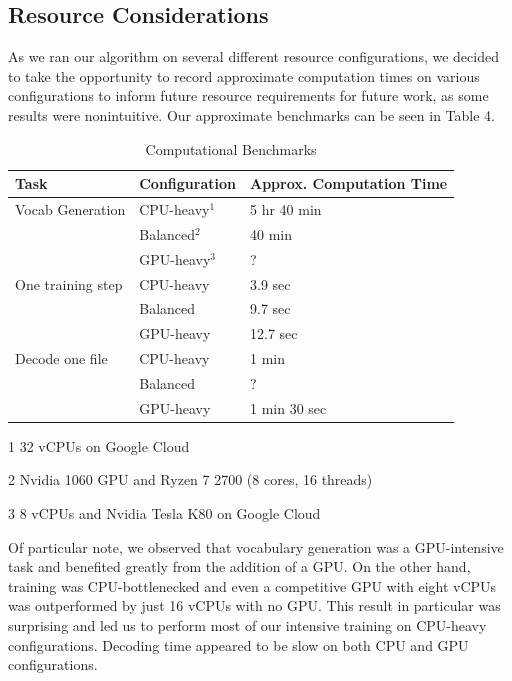 \documentclass[11pt]{article}
\begin{document}
\begin{appendices}

\section{Resource Considerations}

As we ran our algorithm on several different resource configurations, we decided to take the opportunity to record approximate computation times on various configurations to inform future resource requirements for future work, as some results were nonintuitive. Our approximate benchmarks can be seen in Table 4.

\begin{table}[h!]
\begin{threeparttable}
\centering
\begin{small}
\begin{tabular}{|p{2.6cm}|p{2.2cm}|p{2cm}|} 
 \hline
 Task & Configuration & Approx. Computation Time \\ [0.5ex] 
 \hline\hline
 Vocab Generation & CPU-heavy$^{1}$ & 5 hr 40 min \\ 
  & Balanced$^{2}$ & 40 min \\
  & GPU-heavy$^{3}$ & ? \\
 \hline
 One training step & CPU-heavy & 3.9 sec \\
  & Balanced & 9.7 sec \\ 
  & GPU-heavy & 12.7 sec \\[1ex]
 \hline
 Decode one file & CPU-heavy & 1 min \\
  & Balanced & ? \\ 
  & GPU-heavy & 1 min 30 sec  \\[1ex]
 \hline
\end{tabular}
\end{small}
\begin{tablenotes}\footnotesize
\item[1] 32 vCPUs on Google Cloud
\item[2] Nvidia 1060 GPU and Ryzen 7 2700 (8 cores, 16 threads)
\item[3] 8 vCPUs and Nvidia Tesla K80 on Google Cloud
\end{tablenotes}
\caption{Computational Benchmarks}
\end{threeparttable}
\label{table:hardware}
\end{table}

Of particular note, we observed that vocabulary generation was a GPU-intensive task and benefited greatly from the addition of a GPU. On the other hand, training was CPU-bottlenecked and even a competitive GPU with eight vCPUs was outperformed by just 16 vCPUs with no GPU. This result in particular was surprising and led us to perform most of our intensive training on CPU-heavy configurations. Decoding time appeared to be slow on both CPU and GPU configurations.

\end{appendices}
\end{document}
